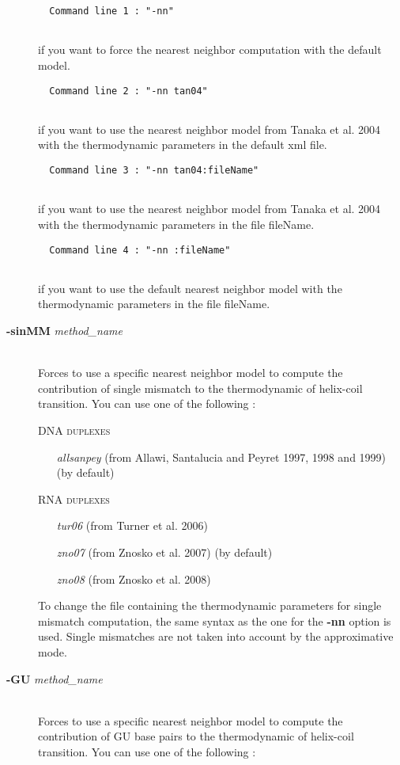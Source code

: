 \documentclass{article}
\begin{document}
\begin{description}
  \begin{verbatim}
  Command line 1 : "-nn" 
  
  \end{verbatim}
  if you want to force the nearest neighbor computation with the default model.
  
  \begin{verbatim}
  Command line 2 : "-nn tan04" 
  
  \end{verbatim}
  if you want to use the nearest neighbor model from Tanaka et al. 2004 with the 
  thermodynamic parameters in the default xml file.
  
  \begin{verbatim}
  Command line 3 : "-nn tan04:fileName" 
  
  \end{verbatim}
  if you want to use the nearest neighbor model from Tanaka et al. 2004 with the 
  thermodynamic parameters in the file fileName.
  
  \begin{verbatim}
  Command line 4 : "-nn :fileName" 
  
  \end{verbatim}
  if you want to use the default nearest neighbor model with the thermodynamic parameters in the file fileName.
  		  
\item [\textbf{-sinMM} \textit{method\_name}]\mbox{}\\ 
  Forces to use a specific nearest neighbor model to compute the contribution of single mismatch to the thermodynamic of helix-coil transition. 
  You can use one of the following :
  
  \textsc{DNA duplexes}
    \begin{itemize}
    \item [\textit{allsanpey}] (from Allawi, Santalucia and Peyret 1997, 1998 and 1999)  (by default) 
    \end{itemize}
  \textsc{RNA duplexes}
    \begin{itemize}
    \item [\textit{tur06}] (from Turner et al. 2006)
    \item [\textit{zno07}] (from Znosko et al. 2007)  (by default)
    \item [\textit{zno08}] (from Znosko et al. 2008)		 		 
    \end{itemize}
  To change the file containing the thermodynamic parameters for single mismatch computation, the same syntax as the one for the \textbf{-nn} option is used.
  Single mismatches are not taken into account by the approximative mode.
\item [\textbf{-GU} \textit{method\_name}]\mbox{}\\ 
  Forces to use a specific nearest neighbor model to compute the contribution of GU base pairs to the thermodynamic of helix-coil transition. 
  You can use one of the following :
  

\end{description}
\end{document}
